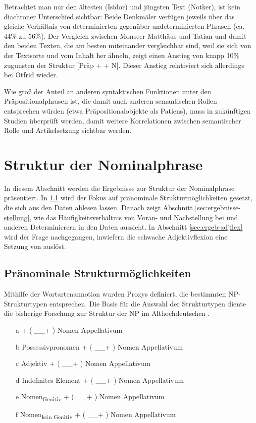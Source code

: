 Betrachtet man nur den ältesten (Isidor) und jüngsten Text (Notker), ist kein diachroner Unterschied sichtbar: Beide Denkmäler verfügen jeweils über das gleiche Verhältnis von determinierten gegenüber undeterminierten Phrasen  (ca. 44\% zu 56\%). Der Vergleich zwischen Monseer Matthäus und Tatian und damit den beiden Texten, die am besten miteinander vergleichbar sind, weil sie sich von der Textsorte und vom Inhalt her ähneln, zeigt einen Anstieg von knapp 10\% zugunsten der Struktur [Präp +  + N]. Dieser Anstieg relativiert sich allerdings bei Otfrid wieder.  

Wie groß der Anteil an anderen syntaktischen Funktionen unter den Präpositionalphrasen ist, die damit auch anderen semantischen Rollen entsprechen würden (etwa Präpositionalobjekte als Patiens), muss in zukünftigen Studien überprüft werden, damit weitere Korrelationen zwischen semantischer Rolle und Artikelsetzung sichtbar werden. 


\section{Struktur der Nominalphrase}\label{erg:struktur.np}

In diesem Abschnitt werden die Ergebnisse zur Struktur der Nominalphrase präsentiert. In \ref{sec:ergeb-np-struktur} wird der Fokus auf pränominale Strukturmöglichkeiten gesetzt, die sich aus den Daten ablesen lassen. Danach zeigt Abschnitt \ref{sec:ergebnisse-stellung}, wie das Häufigkeitsverhältnis von Voran- und Nachstellung bei  und anderen Determinierern in den Daten aussieht. In Abschnitt \ref{sec:ergeb-adjflex} wird der Frage nachgegangen, inwiefern die schwache Adjektivflexion eine Setzung von   auslöst. 

\subsection{Pränominale Strukturmöglichkeiten}\label{sec:ergeb-np-struktur}

Mithilfe der Wortartenannotion wurden Proxys definiert, die bestimmten NP-Strukturtypen entsprechen. Die Basis für die Auswahl der Strukturtypen diente die bisherige Forschung zur Struktur der NP im Althochdeutschen \parencite[vor allem][]{Oubouzar1989}. 

\begin{itemize}
\item [a]  + ( \_\_+ )  Nomen Appellativum
\item [b] Possessivpronomen + ( \_\_+ )  Nomen Appellativum
\item [c] Adjektiv + ( \_\_+ )  Nomen Appellativum
\item [d] Indefinites Element + ( \_\_+ )   Nomen Appellativum
\item [e] Nomen\textsubscript{Genitiv} + ( \_\_+ )   Nomen Appellativum
\item [f]Nomen\textsubscript{kein Genitiv}  + ( \_\_+ )   Nomen Appellativum
\end{itemize}

